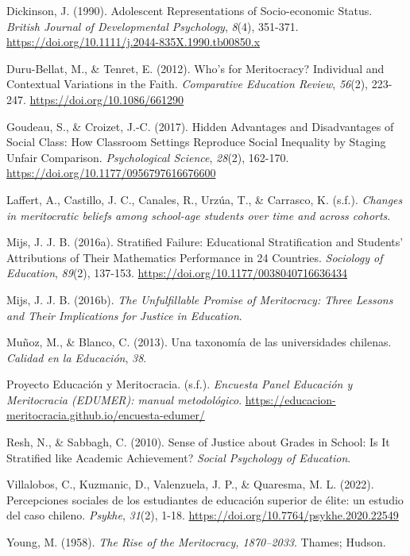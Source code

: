 \documentclass[
  spanish,
  a4paper,
  oneside]{scrbook}
\newlength{\cslhangindent}
\newenvironment{CSLReferences}[2] %
 {\begin{list}{}{%
  \setlength{\itemindent}{0pt}
  \setlength{\leftmargin}{0pt}
  \setlength{\parsep}{0pt}
  \ifodd #1
   \setlength{\leftmargin}{\cslhangindent}
   \setlength{\itemindent}{-1\cslhangindent}
  \fi
  \setlength{\itemsep}{#2\baselineskip}}}
 {\end{list}}
\begin{document}
\begin{CSLReferences}{1}{0}
Dickinson, J. (1990). Adolescent Representations of Socio-economic
Status. \emph{British Journal of Developmental Psychology}, \emph{8}(4),
351-371. \url{https://doi.org/10.1111/j.2044-835X.1990.tb00850.x}

Duru-Bellat, M., \& Tenret, E. (2012). Who's for Meritocracy?
{Individual} and Contextual Variations in the Faith. \emph{Comparative
Education Review}, \emph{56}(2), 223-247.
\url{https://doi.org/10.1086/661290}

Goudeau, S., \& Croizet, J.-C. (2017). Hidden Advantages and
Disadvantages of Social Class: {How} Classroom Settings Reproduce Social
Inequality by Staging Unfair Comparison. \emph{Psychological Science},
\emph{28}(2), 162-170. \url{https://doi.org/10.1177/0956797616676600}

Laffert, A., Castillo, J. C., Canales, R., Urzúa, T., \& Carrasco, K.
(s.f.). \emph{Changes in meritocratic beliefs among school-age students
over time and across cohorts}.

Mijs, J. J. B. (2016a). Stratified Failure: {Educational} Stratification
and Students' Attributions of Their Mathematics Performance in 24
Countries. \emph{Sociology of Education}, \emph{89}(2), 137-153.
\url{https://doi.org/10.1177/0038040716636434}

Mijs, J. J. B. (2016b). \emph{The Unfulfillable Promise of Meritocracy:
Three Lessons and Their Implications for Justice in Education}.

Muñoz, M., \& Blanco, C. (2013). Una taxonomía de las universidades
chilenas. \emph{Calidad en la Educación}, \emph{38}.

Proyecto Educación y Meritocracia. (s.f.). \emph{Encuesta Panel
Educación y Meritocracia (EDUMER): manual metodológico}.
\url{https://educacion-meritocracia.github.io/encuesta-edumer/}

Resh, N., \& Sabbagh, C. (2010). Sense of Justice about Grades in
School: Is It Stratified like Academic Achievement? \emph{Social
Psychology of Education}.

Villalobos, C., Kuzmanic, D., Valenzuela, J. P., \& Quaresma, M. L.
(2022). Percepciones sociales de los estudiantes de educación superior
de élite: un estudio del caso chileno. \emph{Psykhe}, \emph{31}(2),
1-18. \url{https://doi.org/10.7764/psykhe.2020.22549}

Young, M. (1958). \emph{The Rise of the Meritocracy, 1870--2033}.
Thames; Hudson.

\end{CSLReferences}
\end{document}
